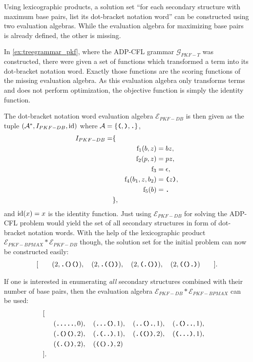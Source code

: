 \documentclass[
    a4paper,
    12pt,
    twoside,
    BCOR=12mm,
    parskip=half,
    chapterprefix,
    numbers=noenddot,
    bibliography=totoc
]{scrbook}
\begin{document}
\begin{example}[continues=ex:adp_solution_pkf]
	Using lexicographic products, a solution set ``for each secondary structure with maximum base pairs, list its dot-bracket notation word'' can be constructed using two evaluation algebras. While the evaluation algebra for maximizing base pairs is already defined, the other is missing.
	
	In \cref{ex:treegrammar_pkf}, where the ADP-CFL grammar $\mathcal{G}_{PKF-T}$ was constructed, there were given a set of functions which transformed a term into its dot-bracket notation word. Exactly those functions are the scoring functions of the missing evaluation algebra. As this evaluation algebra only transforms terms and does not perform optimization, the objective function is simply the identity function.
	
	The dot-bracket notation word evaluation algebra $\mathcal{E}_{PKF-DB}$ is then given as the tuple $(\mathcal{A}^*, I_{PKF-DB}, \mathrm{id})$ where $\mathcal{A}=\{\ts{(},\ts{)},\ts{.}\}$,
	\begin{align*}
		I_{PKF-DB} = &\{&&\\
		&&\op{f}_1 (b,z) &= bz,\\
		&&\op{f}_2 (p,z) &= pz,\\
		&&\op{f}_3 &= \epsilon,\\
		&&\op{f}_4 (b_1,z,b_2) &= \ts{(}z\ts{)},\\
		&&\op{f}_5 (b) &= \ts{.}\\
		&\}, &&
	\end{align*}
	and $\mathrm{id}(x) = x$ is the identity function. Just using $\mathcal{E}_{PKF-DB}$ for solving the ADP-CFL problem would yield the set of all secondary structures in form of dot-bracket notation words. With the help of the lexicographic product $\mathcal{E}_{PKF-BPMAX} * \mathcal{E}_{PKF-DB}$ though, the solution set for the initial problem can now be constructed easily:
  \[ [\qquad (2,\ts{.()()}),\quad (2,\ts{.(())}),\quad (2,\ts{(.())}),\quad (2,\ts{(().)}) \qquad]. \]

	If one is interested in enumerating \emph{all} secondary structures combined with their number of base pairs, then the evaluation algebra $\mathcal{E}_{PKF-DB} * \mathcal{E}_{PKF-BPMAX}$ can be used:
	\begin{align*}
		&[\\
		&&&(\ts{.....}, 0),\quad (\ts{...()}, 1),\quad (\ts{..().}, 1),\quad (\ts{.()..}, 1),\\
		&&&(\ts{.()()}, 2),\quad (\ts{.(..)}, 1),\quad (\ts{.(())}, 2),\quad (\ts{(...)}, 1),\\
		&&&(\ts{(.())}, 2),\quad (\ts{(().)}, 2)\\
		&].&&
	\end{align*}
\end{example}
\end{document}
